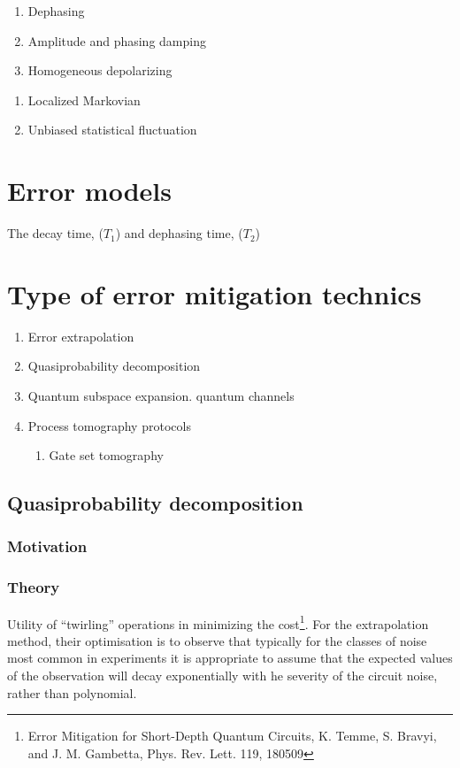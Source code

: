 \documentclass[11pt, oneside]{article}   	%
\begin{document}
\begin{enumerate}
\item Dephasing
\item Amplitude and phasing damping
\item Homogeneous depolarizing
\end{enumerate}

\begin{enumerate}
\item Localized Markovian
\item Unbiased statistical fluctuation
\end{enumerate}

\section{Error models}
The decay time,  ($T_1$) and dephasing time,  ($T_2$) 

\section{Type of error mitigation technics}
\begin{enumerate}
\item Error extrapolation
\item Quasiprobability decomposition
\item Quantum subspace expansion. quantum channels
\item Process tomography protocols
\begin{enumerate}
\item Gate set tomography
\end{enumerate}
\end{enumerate}

\subsection{Quasiprobability decomposition}
\subsubsection{Motivation}
\subsubsection{Theory}
Utility of ``twirling'' operations in minimizing the cost\footnote{Error Mitigation for Short-Depth Quantum Circuits, K. Temme, S. Bravyi, and J. M. Gambetta, Phys. Rev. Lett. 119, 180509}.
For the extrapolation method, their optimisation is to observe that typically for the classes of noise most common in experiments it is appropriate to assume that the expected values of the observation will decay exponentially with he severity of the circuit noise, rather than polynomial.
\end{document}
